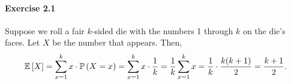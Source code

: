 \paragraph{Exercise 2.1} Suppose we roll a fair $k$-sided die with the numbers 1
through $k$ on the die’s faces. Let $X$ be the number that appears. Then,
\[
  \mathbb{E}\left[X\right]
  = \sum_{x=1}^k x \cdot \mathbb{P}\left(X = x\right)
  = \sum_{x=1}^k x \cdot \frac{1}{k}
  = \frac{1}{k} \sum_{x=1}^k x
  = \frac{1}{k} \cdot \frac{k(k+1)}{2}
  = \frac{k+1}{2}.
\]
